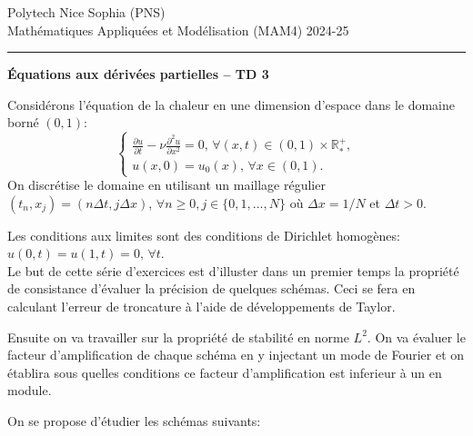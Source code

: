 \documentclass[12pt,a4paper]{article}
\begin{document}
 \hfill Polytech Nice Sophia (PNS)\\
\noindent Math\'ematiques Appliqu\'ees et Mod\'elisation (MAM4) \hfill 2024-25 \\

\hrule

\bigskip
\bigskip

\begin{center}{\bf \'Equations aux d\'eriv\'ees partielles --
TD 3}\end{center}

\bigskip

\parskip 12pt
\noindent Consid\'erons l'\'equation de la chaleur en une dimension d'espace dans le domaine born\'e $(0,1)$:
$$
\begin{cases}
\displaystyle\frac{\partial u}{\partial t}-\nu \frac{\partial^2 u}{\partial x^2}=0,\, \forall (x,t)\in(0,1)\times\mathbb{R}^+_*,\\[2ex]
u(x,0)=u_0(x),\,\forall x\in (0,1).
\end{cases}
$$
On discr\'etise le domaine en utilisant un maillage r\'egulier
$(t_n,x_j)=(n\Delta t,j\Delta x)$,  $\forall n\ge 0,
j\in\{0,1,...,N\}$ o\`u $\Delta x=1/N$ et $\Delta t>0$. 

\noindent Les conditions aux limites sont des conditions de Dirichlet homog\`enes:
$u(0,t)=u(1,t)=0,\,\forall t$. \\

\noindent Le but de cette s\'erie d'exercices est d'illuster dans un premier temps la propri\'et\'e de consistance
d'\'evaluer la pr\'ecision de quelques sch\'emas. Ceci se fera en calculant l'erreur de troncature \`a l'aide de d\'eveloppements de
Taylor. 
 
\noindent Ensuite on va travailler sur la
propri\'et\'e de stabilit\'e en norme $L^2$. On va \'evaluer le facteur
d'amplification de chaque sch\'ema en y injectant un mode de Fourier
et on \'etablira sous quelles conditions ce facteur d'amplification
est inferieur \`a un en module. 


\noindent On se propose d'\'etudier les sch\'emas suivants:
\end{document}
